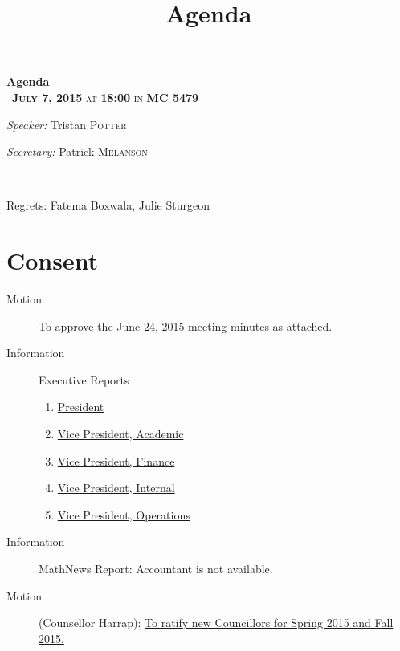 \documentclass[12pt, letterpaper]{article}
\title{Agenda}
\newcommand{\meetingDate}{July 7, 2015}
\newcommand{\meetingTime}{18:00}
\newcommand{\meetingLocation}{MC 5479}
\begin{document}
\hypersetup{} %


\begin{center}
{ \huge \bfseries Agenda \\[0.4cm] }
{\textsc{~\textbf{\meetingDate} at \textbf{\meetingTime} in \textbf{\meetingLocation}}}
\\[0.2cm]

\begin{minipage}[t]{0.5\textwidth}
\begin{flushleft} \large
\emph{Speaker:}
Tristan \textsc{Potter}
\end{flushleft}
\end{minipage}%
\begin{minipage}[t]{0.5\textwidth}
\begin{flushright} \large
\emph{Secretary:} 
Patrick \textsc{Melanson}
\end{flushright}
\end{minipage}

\HRule \\[0.4cm]
\end{center}
Regrets: Fatema Boxwala, Julie Sturgeon

\section*{Consent}
\begin{description}
	\item[Motion] To approve the June 24, 2015 meeting minutes as \hyperref[minutes]{attached}.
	\item[Information] Executive Reports
	\begin{enumerate}
		\item \hyperref[president]{President}
		\item \hyperref[vpacademic]{Vice President, Academic}
		\item \hyperref[vpfinance]{Vice President, Finance}
		\item \hyperref[vpinternal]{Vice President, Internal}
		\item \hyperref[vpoperations]{Vice President, Operations}
	\end{enumerate}
	\item[Information] MathNews Report: Accountant is not available.
	\item[Motion] (Counsellor Harrap): \hyperref[noms]{To ratify new Councillors for Spring 2015 and Fall 2015.}
\end{description}
\HRule
\end{document}
